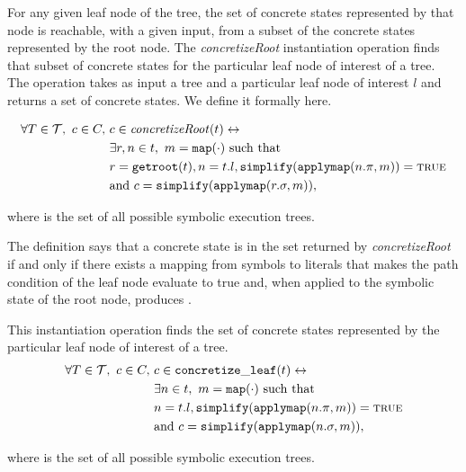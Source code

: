 \begin{mydefinition}
  \label{def:concroot}
  
  For any given leaf node of the
  tree, the set of concrete states represented by that node is reachable, with a
  given input, from a subset of the concrete states represented by the root
  node. The \emph{concretizeRoot} instantiation operation finds that subset of concrete states
  for the particular leaf node of interest of a tree. The operation takes as
  input a tree \tree{} and a particular leaf node of interest $l$ and returns
  a set of concrete states. We define it formally here.

  \begin{align*}
\forall T \in \mathcal{T},~ c \in C,~& c \in
\mathit{concretizeRoot}(t) \leftrightarrow \\
&\exists r,n \in t,~ m = \mathtt{map(\cdot)} \mathrm{~such~that}\\
&r = \mathtt{getroot}(t), n = t.l,
\mathtt{simplify}(\mathtt{applymap} (n.\pi, m)) = \mathtt{\textsc{true}} \\
&\mathrm{and~}  c = \mathtt{simplify}(\mathtt{applymap}(r.\sigma, m)),
    \end{align*}
\end{mydefinition}
where \trees{} is the set of all possible symbolic execution trees.

The definition says that a concrete state \concstate{} is in the set returned by
\emph{concretizeRoot} if and only if there exists a mapping from symbols to
literals that makes the path condition of the leaf node evaluate to true
and, when applied to the symbolic state of the root node, produces \concstate{}.

\begin{mydefinition}
  \label{def:concleaf}

  This instantiation operation finds the set of concrete states represented by
  the particular leaf node of interest of a tree.
  \begin{align*}
\forall T \in \mathcal{T},~ c \in C,~& c \in
\mathtt{concretize\_leaf}(t) \leftrightarrow \\
&\exists n \in t,~ m = \mathtt{map(\cdot)} \mathrm{~such~that}\\
&n = t.l,
\mathtt{simplify}(\mathtt{applymap} (n.\pi, m)) = \mathtt{\textsc{true}} \\
&\mathrm{and~}  c = \mathtt{simplify}(\mathtt{applymap}(n.\sigma, m)),
    \end{align*}
\end{mydefinition}
where \trees{} is the set of all possible symbolic execution trees.

